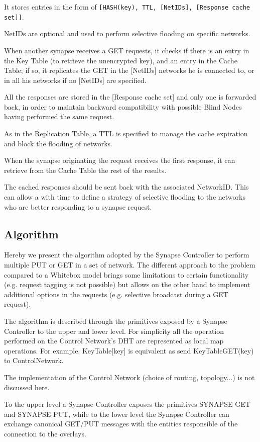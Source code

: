 It stores entries in the form of {\tt[HASH(key), TTL, [NetIDs], [Response cache set]]}.

NetIDs are optional and used to perform selective flooding on specific networks.

When another synapse receives a GET requests, it checks if there is an entry in the Key Table (to retrieve the unencrypted key), and an entry in the Cache Table; if so, it replicates the GET in the [NetIDs] networks he is connected to, or in all his networks if no [NetIDs] are specified.

All the responses are stored in the [Response cache set] and only one is forwarded back, in order to maintain backward compatibility with possible Blind Nodes having performed the same request.

As in the Replication Table, a TTL is specified to manage the cache expiration and block the flooding of networks.

When the synapse originating the request receives the first response, it can retrieve from the Cache Table the rest of the results.

The cached responses should be sent back with the associated NetworkID. This can allow a with time to define a strategy of selective flooding to the networks who are better responding to a synapse request.

\subsection{Algorithm} 
%
Hereby we present the algorithm adopted by the Synapse Controller to perform multiple PUT or GET in a set of network.
The different approach to the problem compared to a Whitebox model brings some limitations to certain functionality
(e.g. request tagging is not possible) but allows on the other hand to implement additional options in the requests (e.g.
selective broadcast during a GET request).

The algorithm is described through the primitives exposed by a Synapse Controller to the upper and lower level.
For simplicity all the operation performed on the Control Network's DHT are represented as local map operations.
For example, KeyTable[key] is equivalent as send KeyTableGET(key) to ControlNetwork.

The implementation of the Control Network (choice of routing, topology...) is not discussed here.

To the upper level a Synapse Controller exposes the primitives SYNAPSE GET and SYNAPSE PUT, while
to the lower level the Synapse Controller can exchange canonical GET/PUT messages with the entities responsible of the connection to the overlays.

